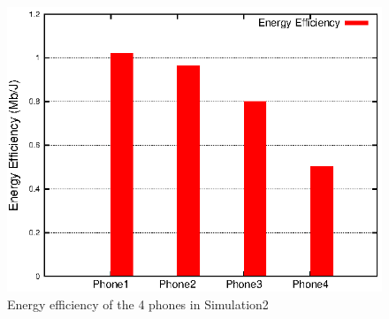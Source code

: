 \documentclass[journal]{IEEEtran}
\begin{document}
\begin{figure}
\centering
\includegraphics[scale=0.85]{result_markov_efficiency.eps}
\caption{Energy efficiency of the 4 phones in Simulation2}
\end{figure}
\end{document}
